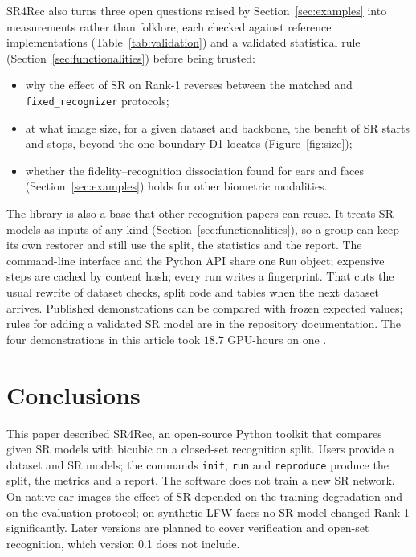 \documentclass[preprint,12pt]{elsarticle}
\begin{document}
SR4Rec also turns three open questions raised by Section~\ref{sec:examples} into measurements
rather than folklore, each checked against reference implementations (Table~\ref{tab:validation})
and a validated statistical rule (Section~\ref{sec:functionalities}) before being trusted:
\begin{itemize}
  \item why the effect of SR on Rank-1 reverses between the matched and \texttt{fixed\_recognizer}
    protocols;
  \item at what image size, for a given dataset and backbone, the benefit of SR starts and stops,
    beyond the one boundary D1 locates (Figure~\ref{fig:size});
  \item whether the fidelity--recognition dissociation found for ears and faces
    (Section~\ref{sec:examples}) holds for other biometric modalities.
\end{itemize}

The library is also a base that other recognition papers can reuse. It treats SR models as inputs
of any kind (Section~\ref{sec:functionalities}), so a group can keep its own restorer and still
use the split, the statistics and the report. The command-line interface and
the Python API share one \texttt{Run} object; expensive steps are cached by content hash; every
run writes a fingerprint. That cuts the usual rewrite of dataset checks, split code and tables
when the next dataset arrives. Published demonstrations can be compared with frozen expected
values; rules for adding a validated SR model are in the repository documentation. The four
demonstrations in this article took $18.7$ GPU-hours on one \DONEDevice{}.

\section{Conclusions}
\label{sec:conclusions}

This paper described SR4Rec, an open-source Python toolkit that compares given SR models with
bicubic on a closed-set recognition split. Users provide a dataset and SR models; the commands
\texttt{init}, \texttt{run} and \texttt{reproduce} produce the split, the metrics and a report.
The software does not train a new SR network. On native ear images the effect of SR depended on
the training degradation and on the evaluation protocol; on synthetic LFW faces no SR model
changed Rank-1 significantly. Later versions are planned to cover verification and open-set
recognition, which version 0.1 does not include.
\end{document}
